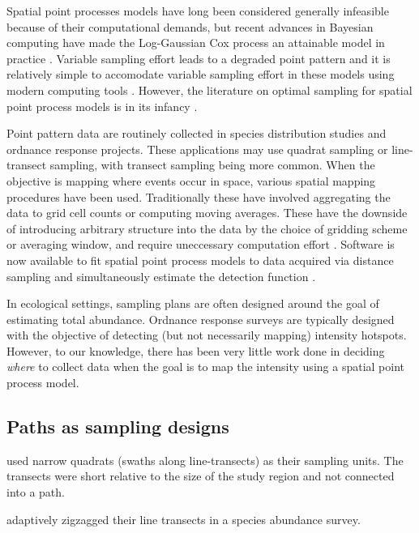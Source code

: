 \documentclass[review]{elsarticle}
\begin{document}
Spatial point processes models have long been considered generally infeasible
because of their computational demands, but recent advances in Bayesian
computing have made the Log-Gaussian Cox process an attainable model in
practice \citep{rueetal, lindgrenetal, illianetal, simpsonetal}. Variable
sampling effort leads to a degraded point pattern \cite{chakrabortyetal} and
it is relatively simple to accomodate variable sampling effort in these models
using modern computing tools \citep{yuanetal}. However, the literature on
optimal sampling for spatial point process models is in its infancy
\citep{liuvanhatalo}.

Point pattern data are routinely collected in species distribution studies and
ordnance response projects. These applications may use quadrat sampling or
line-transect sampling, with transect sampling being more common. When the
objective is mapping where events occur in space, various spatial mapping
procedures have been used. Traditionally these have involved aggregating the
data to grid cell counts or computing moving averages. These have the downside
of introducing arbitrary structure into the data by the choice of gridding
scheme or averaging window, and require uneccessary computation effort
\citep{simpsonetal}. Software is now available to fit spatial point process
models to data acquired via distance sampling and simultaneously estimate the
detection function \citep{dspat}.

In ecological settings, sampling plans are often designed around the goal of
estimating total abundance. Ordnance response surveys are typically designed
with the objective of detecting (but not necessarily mapping) intensity
hotspots. However, to our knowledge, there has been very little work done in
deciding \emph{where} to collect data when the goal is to map the intensity
using a spatial point process model.


\subsection{Paths as sampling designs}

\citet{liuvanhatalo} used narrow quadrats (swaths along line-transects) as
their sampling units. The transects were short relative to the size of the
study region and not connected into a path.

\citet{pollard} adaptively zigzagged their line transects in a species
abundance survey.
\end{document}
